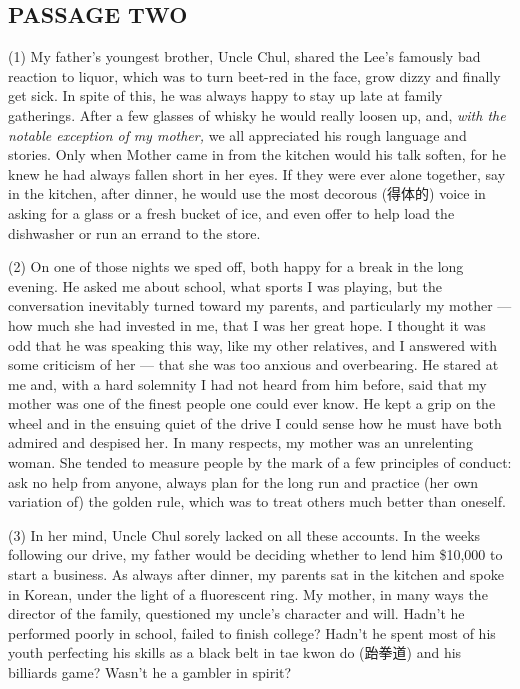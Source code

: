 \documentclass[UTF8,11pt]{ctexart}
\begin{document}
\subsection*{\textbf{PASSAGE TWO}}


(1) My father’s youngest brother, Uncle Chul, shared the Lee’s famously bad reaction to liquor, which was to turn beet-red in the face, grow dizzy and finally get sick. In spite of this, he was always happy to stay up late at family gatherings. After a few glasses of whisky he would really loosen up, and, \textit{with the notable exception of} \textit{my mother,} we all appreciated his rough language and stories. Only when Mother came in from the kitchen would his talk soften, for he knew he had always fallen short in her eyes. If they were ever alone together, say in the kitchen, after dinner, he would use the most decorous (得体的) voice in asking for a glass or a fresh bucket of ice, and even offer to help load the dishwasher or run an errand to the store.


(2) On one of those nights we sped off, both happy for a break in the long evening. He asked me about school, what sports I was playing, but the conversation inevitably turned toward my parents, and particularly my mother — how much she had invested in me, that I was her great hope. I thought it was odd that he was speaking this way, like my other relatives, and I answered with some criticism of her — that she was too anxious and overbearing. He stared at me and, with a hard solemnity I had not heard from him before, said that my mother was one of the finest people one could ever know. He kept a grip on the wheel and in the ensuing quiet of the drive I could sense how he must have both admired and despised her. In many respects, my mother was an unrelenting woman. She tended to measure people by the mark of a few principles of conduct: ask no help from anyone, always plan for the long run and practice (her own variation of) the golden rule, which was to treat others much better than oneself.


(3) In her mind, Uncle Chul sorely lacked on all these accounts. In the weeks following our drive, my father would be deciding whether to lend him \$10,000 to start a business. As always after dinner, my parents sat in the kitchen and spoke in Korean, under the light of a fluorescent ring. My mother, in many ways the director of the family, questioned my uncle’s character and will. Hadn’t he performed poorly in school, failed to finish college? Hadn’t he spent most of his youth perfecting his skills as a black belt in tae kwon do (跆拳道) and his billiards game? Wasn’t he a gambler in spirit?
\end{document}
